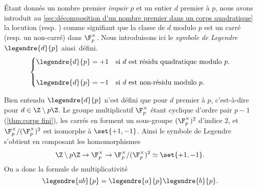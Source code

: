 \documentclass[11pt, useosf,
  title in boldface,
  theorem in new line,
  theorem numbering = section,
  number theorems separately,
]{simplivre}
\begin{document}
    Étant donnés un nombre premier \emph{impair} \( p \) et un entier \( d \) premier à \( p \), nous avons introduit au \cref{sec:décomposition d'un nombre premier dans un corps quadratique} la locution  (resp. ) comme signifiant que la classe de \( d \) modulo \( p \) est un carré (resp. un non-carré) dans \( \F_p^\times \). Nous introduisons ici le \emph{symbole de Legendre} \( \legendre{d}{p} \) ainsi~défini.
    \vspace{-.3\baselineskip}
    \begin{equation}
        \begin{cases}
            \displaystyle\legendre{d}{p} = +1 & \text{si \( d \) est résidu quadratique modulo \( p \)}.\\[1.5em]
            \displaystyle\legendre{d}{p} = -1 & \text{si \( d \) est non-résidu modulo \( p \)}.
        \end{cases}
    \end{equation}

    Bien entendu \( \legendre{d}{p} \) n'est défini que pour \( d \) premier à \( p \), c'est-à-dire pour \( d \in \Z \setminus p\Z \). Le groupe multiplicatif \( \F_p^\times \) étant cyclique d'ordre pair \( p-1 \) (\cref{thm:corps fini}), les carrés en forment un sous-groupe \( (\F_p^\times)^2 \) d'indice \( 2 \), et \( \F_p^\times/(\F_p^\times)^2 \) est isomorphe à \( \set{+1,-1} \). Ainsi le symbole de Legendre s'obtient en composant les homomorphismes
    \[
        \Z \setminus p\Z \to \F_p^\times \to \F_p^\times/(\F_p^\times)^2 \simeq \set{+1,-1}.
    \]
    On a donc la formule de multiplicativité
    \begin{equation}\label{eq:multiplicativité du symbole de Legendre}
        \legendre{ab}{p} = \legendre{a}{p} \legendre{b}{p}.
    \end{equation}
\end{document}
